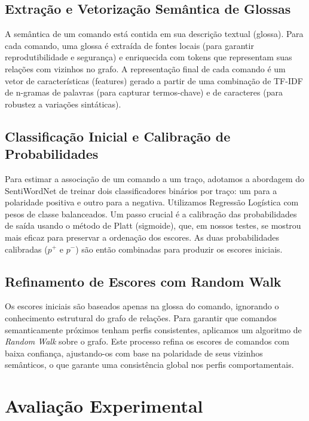 \documentclass[12pt]{article}
\begin{document}
\subsection{Extração e Vetorização Semântica de Glossas}

A semântica de um comando está contida em sua descrição textual (glossa). Para cada comando, uma glossa é extraída de fontes locais (para garantir reprodutibilidade e segurança) e enriquecida com tokens que representam suas relações com vizinhos no grafo. A representação final de cada comando é um vetor de características (features) gerado a partir de uma combinação de TF-IDF de n-gramas de palavras (para capturar termos-chave) e de caracteres (para robustez a variações sintáticas).

\subsection{Classificação Inicial e Calibração de Probabilidades}

Para estimar a associação de um comando a um traço, adotamos a abordagem do SentiWordNet de treinar dois classificadores binários por traço: um para a polaridade positiva e outro para a negativa. Utilizamos Regressão Logística com pesos de classe balanceados. Um passo crucial é a calibração das probabilidades de saída usando o método de Platt (sigmoide), que, em nossos testes, se mostrou mais eficaz para preservar a ordenação dos escores. As duas probabilidades calibradas ($p^+$ e $p^-$) são então combinadas para produzir os escores iniciais.

\subsection{Refinamento de Escores com Random Walk}

Os escores iniciais são baseados apenas na glossa do comando, ignorando o conhecimento estrutural do grafo de relações. Para garantir que comandos semanticamente próximos tenham perfis consistentes, aplicamos um algoritmo de \textit{Random Walk} sobre o grafo. Este processo refina os escores de comandos com baixa confiança, ajustando-os com base na polaridade de seus vizinhos semânticos, o que garante uma consistência global nos perfis comportamentais.

\section{Avaliação Experimental}
\label{sec:ava}
\end{document}

